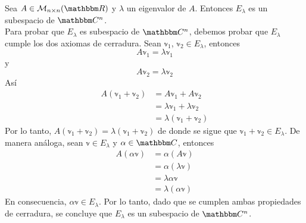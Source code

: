 \begin{theorem}
    Sea $A \in \mathcal{M}_{n \times n}(\RR)$ y $\lambda$ un eigenvalor de $A$. Entonces $E_{\lambda}$ es un subespacio de $\CC[n]$. \\
    \demostracion Para probar que $E_{\lambda}$ es subespacio de $\CC[n]$, debemos probar que $E_{\lambda}$ cumple los dos axiomas de cerradura. Sean $\mathbb{v}_1$, $\mathbb{v}_2 \in E_{\lambda}$, entonces
    $$A \mathbb{v}_1 = \lambda \mathbb{v}_1$$
    y
    $$A \mathbb{v}_2 = \lambda \mathbb{v}_2$$
    Así
    \begin{align*}
        A(\mathbb{v}_1 + \mathbb{v}_2) & = A\mathbb{v}_1 + A\mathbb{v}_2 \\
        & = \lambda \mathbb{v}_1 + \lambda \mathbb{v}_2 \\
        & = \lambda (\mathbb{v}_1 + \mathbb{v}_2)
    \end{align*}
    Por lo tanto, $A(\mathbb{v}_1 + \mathbb{v}_2) = \lambda (\mathbb{v}_1 + \mathbb{v}_2)$ de donde se sigue que $\mathbb{v}_1 + \mathbb{v}_2 \in E_{\lambda}$. De manera análoga, sean $\mathbb{v} \in E_{\lambda}$ y $\alpha \in \CC$, entonces
    \begin{align*}
        A(\alpha \mathbb{v}) & = \alpha (A \mathbb{v}) \\
        & = \alpha (\lambda \mathbb{v}) \\
        & = \lambda \alpha \mathbb{v} \\
        & = \lambda (\alpha \mathbb{v})
    \end{align*}
    En consecuencia, $\alpha \mathbb{v} \in E_{\lambda}$. Por lo tanto, dado que se cumplen ambas propiedades de cerradura, se concluye que $E_{\lambda}$ es un subespacio de $\CC[n]$.
\end{theorem}

